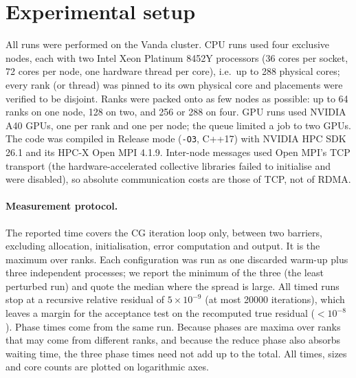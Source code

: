 \documentclass[11pt,a4paper]{article}
\begin{document}
\section{Experimental setup}\label{sec:setup}
All runs were performed on the Vanda cluster. CPU runs used four exclusive nodes, each with
two Intel Xeon Platinum 8452Y processors (36 cores per socket, 72 cores per node, one hardware
thread per core), i.e.\ up to 288 physical cores; every rank (or thread) was pinned to its own
physical core and placements were verified to be disjoint. Ranks were packed onto as few nodes as
possible: up to 64 ranks on one node, 128 on two, and 256 or 288 on four. GPU runs used NVIDIA A40
GPUs, one per rank and one per node; the queue limited a job to two GPUs. The code was compiled in
Release mode (\texttt{-O3}, C++17) with NVIDIA HPC SDK 26.1 and its HPC-X Open MPI 4.1.9.
Inter-node messages used Open MPI's TCP transport (the hardware-accelerated collective libraries
failed to initialise and were disabled), so absolute communication costs are those of TCP, not
of RDMA.

\paragraph{Measurement protocol.} The reported time covers the CG iteration loop only, between
two barriers, excluding allocation, initialisation, error computation and output. It is the
maximum over ranks. Each configuration was run as one discarded warm-up plus three independent
processes; we report the minimum of the three (the least perturbed run) and quote the median
where the spread is large. All timed runs stop at a recursive relative residual of
$5\times10^{-9}$ (at most 20000 iterations), which leaves a margin for the acceptance test on the
recomputed true residual ($<10^{-8}$). Phase times come from the same run. Because phases are maxima over
ranks that may come from different ranks, and because the reduce phase also absorbs waiting
time, the three phase times need not add up to the total. All times, sizes and core counts are
plotted on logarithmic axes.

\end{document}
